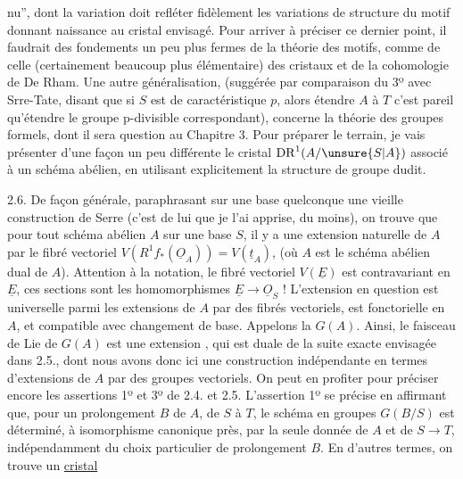 nu'', dont la variation doit refléter fidèlement les variations de structure du motif donnant naissance au cristal envisagé. Pour arriver à préciser ce dernier point, il faudrait des fondements un peu plus fermes de la théorie des motifs, comme de celle (certainement beaucoup plus élémentaire) des cristaux et de la cohomologie de De Rham. Une autre généralisation, (suggérée par comparaison du 3º avec Srre-Tate, disant que si $S$ est de caractéristique $p$, alors étendre $A$ à $T$\inserted{,} c'est pareil qu'étendre le groupe p-divisible correspondant), concerne la théorie des groupes formels, dont il sera question au Chapitre 3. Pour préparer le terrain, je vais présenter d'une façon un peu différente le cristal $\operatorname{DR}^1(A/\unsure{S|A})$ associé à un schéma abélien, en utilisant explicitement la structure de groupe dudit.

2.6. De façon générale, paraphrasant sur une base quelconque une vieille construction de Serre (c'est de lui que je l'ai apprise, du moins), on trouve que pour tout schéma abélien $A$ sur une base $S$, il y a une extension naturelle de $A$ par le fibré vectoriel $V(R^1f_*(\underline{O}_A))=V(\underline{t}_A)$, (où $A$ est le schéma abélien dual de $A$). Attention à la notation, le fibré vectoriel $V(\underline{E})$ est contravariant en $\underline{E}$, ces sections sont les homomorphismes $\underline{E}\longrightarrow\underline{O}_S$ ! L'extension en question est universelle parmi les extensions de $A$ par des fibrés vectoriels, est fonctorielle en $A$, et compatible avec changement de base. Appelons la $G(A)$. Ainsi, le faisceau de Lie de $G(A)$ est une extension
,
qui est duale de la suite exacte envisagée dans 2.5., dont nous avons donc ici une construction indépendante en termes d'extensions de $A$ par des groupes vectoriels. On peut en profiter pour préciser encore les assertions 1º et 3º de 2.4. et 2.5. L'assertion 1º se précise en affirmant que, pour un prolongement $B$ de $A$, de $S$ à $T$, le schéma en groupes $G(B/S)$ est déterminé, à isomorphisme canonique  près, par la seule donnée de $A$ et de  $S\longrightarrow T$, indépendamment du choix particulier de prolongement $B$. En d'autres termes, on trouve un \uline{cristal}


